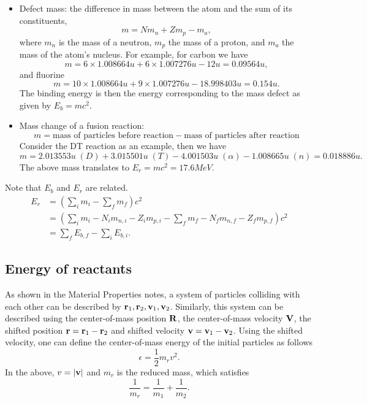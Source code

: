 \documentclass[a4paper,11pt]{article}
\begin{document}
\begin{itemize}
\item Defect mass: the difference in mass between the atom and the sum of its constituents,
\begin{equation}
m = N m_n + Z m_p - m_a,
\end{equation}
where $m_n$ is the mass of a neutron, $m_p$ the mass of a proton, and $m_a$ the mass of the atom's nucleus. For example, for carbon we have
\begin{equation}
m = 6 \times 1.008664 u + 6 \times 1.007276 u - 12u = 0.09564 u,
\end{equation}
and fluorine
\begin{equation}
m = 10 \times 1.008664 u + 9 \times 1.007276 u - 18.998403u = 0.154 u.
\end{equation}
The binding energy is then the energy corresponding to the mass defect as given by  $E_b = m c^2$.

\item Mass change of a fusion reaction:
\begin{equation}
m = \text{mass of particles before reaction} - \text{mass of particles after reaction} 
\end{equation}
Consider the DT reaction as an example, then we have
\begin{equation}
m = 2.013553u \;(D) + 3.015501u \;(T) - 4.001503u \;(\alpha) - 1.008665u \;(n) = 0.018886u.
\end{equation}
The above mass translates to $E_r = mc^2 = 17.6MeV$.
\end{itemize}

Note that $E_b$ and $E_r$ are related. 
\begin{align}
    E_r &= \left ( \sum_i m_i - \sum_f m_f \right ) c^2 \nonumber \\
    &= \left ( \sum_i m_i - N_i m_{n,i} - Z_i m_{p,i} - \sum_f m_f - N_f m_{n,f} - Z_f m_{p,f}\right ) c^2 \nonumber \\
    &= \sum_f E_{b,f} - \sum_i E_{b,i}.
\end{align}

\subsection{Energy of reactants}
As shown in the Material Properties notes, a system of particles colliding with each other can be described by $\mathbf{r}_1, \mathbf{r}_2, \mathbf{v}_1, \mathbf{v}_2$. Similarly, this system can be described using the center-of-mass position $\mathbf{R}$, the center-of-mass velocity $\mathbf{V}$, the shifted position $\mathbf{r} = \mathbf{r}_1 - \mathbf{r}_2$ and shifted velocity $\mathbf{v} = \mathbf{v}_1 - \mathbf{v}_2$. Using the shifted velocity, one can define the center-of-mass energy of the initial particles as follows
\begin{equation}
    \epsilon = \frac{1}{2} m_r v^2.
\end{equation}
In the above, $v = |\mathbf{v}|$ and $m_r$ is the reduced mass, which satisfies
\begin{equation}
    \frac{1}{m_r} = \frac{1}{m_1} + \frac{1}{m_2}.
\end{equation}
\end{document}
